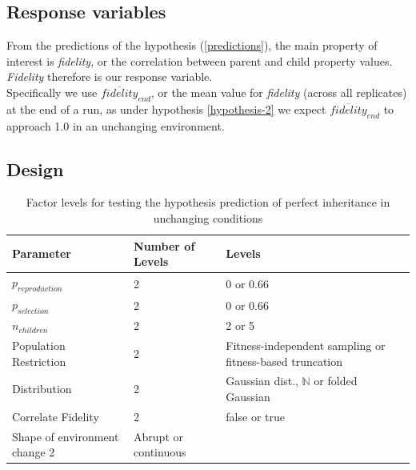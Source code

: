 \subsection{Response variables}\label{response-variables}

From the predictions of the hypothesis (\cref{predictions}), the main property of interest is \emph{fidelity}, or the correlation between parent and child property values. \emph{Fidelity} therefore is our response variable.
\\

Specifically we use $\overline{fidelity}_{end}$, or the mean value for \emph{fidelity} (across all replicates) at the end of a run, as under hypothesis \autoref{hypothesis-2} we expect $\overline{fidelity}_{end}$ to approach 1.0 in an unchanging environment.

\subsection{Design}\label{design}



\begin{table} %
	\begin{center}
		\caption{Factor levels for testing the hypothesis prediction of perfect inheritance in unchanging conditions}
		\begin{tabular}{@{}llp{6cm}@{}}
			\toprule
			Parameter              & Number of Levels & Levels                                                   \\
			\midrule
			$p_{reproduction}$     & 2                & 0 or 0.66                                                \\
			$p_{selection}$        & 2                & 0 or 0.66                                                \\
			$n_{children}$         & 2                & 2 or 5                                                   \\
			Population Restriction & 2                & Fitness-independent sampling or fitness-based truncation \\
			Distribution           & 2                & Gaussian dist., $\mathbb{N}$ or folded Gaussian          \\
			Correlate Fidelity     & 2                & false or true                                            \\
			Shape of environment change		2&	Abrupt or continuous\\
			\bottomrule
		\end{tabular}
	\end{center}
\end{table}

